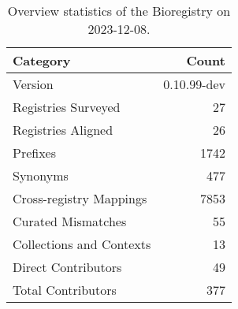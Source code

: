 \begin{table}
\caption{Overview statistics of the Bioregistry on 2023-12-08.}
\label{tab:bioregistry-summary}
\begin{tabular}{lr}
\toprule
Category & Count \\
\midrule
Version & 0.10.99-dev \\
Registries Surveyed & 27 \\
Registries Aligned & 26 \\
Prefixes & 1742 \\
Synonyms & 477 \\
Cross-registry Mappings & 7853 \\
Curated Mismatches & 55 \\
Collections and Contexts & 13 \\
Direct Contributors & 49 \\
Total Contributors & 377 \\
\bottomrule
\end{tabular}
\end{table}
